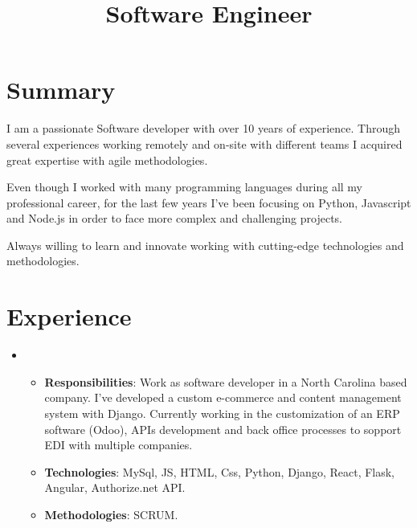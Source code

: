 \documentclass[11pt,a4paper,sans]{moderncv}        %
\title{Software Engineer}                               %
\begin{document}
\makecvtitle

\section{Summary}
I am a passionate Software developer with over 10 years of experience.
\medskip Through several experiences working remotely and on-site with different teams I acquired great expertise with agile methodologies.

\medskip Even though I worked with many programming languages during all my professional career, for the last few years I've been focusing on Python,
Javascript and Node.js in order to face more complex and challenging projects.

\medskip Always willing to learn and innovate working with cutting-edge technologies and methodologies.

\section{Experience}
  {
    \begin{itemize}
      \item
        \begin{itemize}
          \item \textbf{Responsibilities}: Work as software developer in a North Carolina based company. I've developed a custom e-commerce and content management system with Django. Currently working in the customization of an ERP software (Odoo), APIs development and back office processes to sopport EDI with multiple companies.
          \item \textbf{Technologies}: MySql, JS, HTML, Css, Python, Django, React, Flask, Angular, Authorize.net API.
          \item \textbf{Methodologies}: SCRUM.
        \end{itemize}
    \end{itemize}
  }
\end{document}
